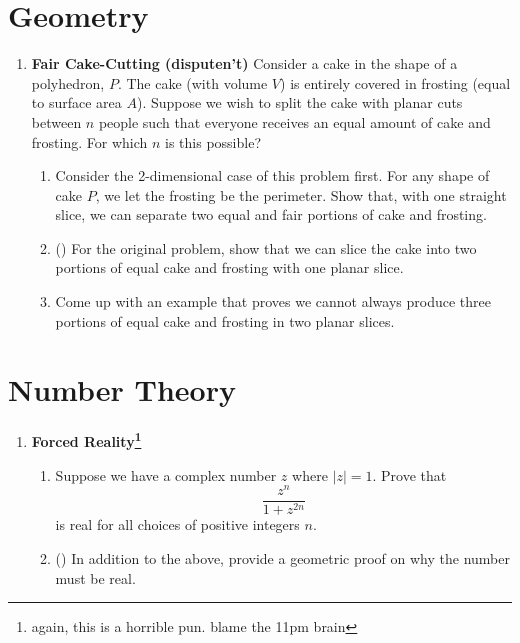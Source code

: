 \documentclass[11pt]{scrartcl}
\begin{document}
\section{Geometry}
\begin{enumerate}[label=\textbf{G\arabic*}.]
    \item \textbf{Fair Cake-Cutting (disputen't)} \newline
    Consider a cake in the shape of a polyhedron, $P$. The cake (with volume $V$) is entirely covered in frosting (equal to surface area $A$). Suppose we wish to split the cake with planar cuts between $n$ people such that everyone receives an equal amount of cake and frosting. For which $n$ is this possible?
    
    \begin{enumerate}
        \item Consider the 2-dimensional case of this problem first. For any shape of cake $P$, we let the frosting be the perimeter. Show that, with one straight slice, we can separate two equal and fair portions of cake and frosting.
        
        \item (\fullchili) For the original problem, show that we can slice the cake into two portions of equal cake and frosting with one planar slice.
        
        \item Come up with an example that proves we cannot always produce three portions of equal cake and frosting in two planar slices.
    \end{enumerate}
\end{enumerate}

\newpage
\section{Number Theory}
\begin{enumerate}[label=\textbf{N\arabic*}.]
    \item \textbf{Forced Reality\footnote{again, this is a horrible pun. blame the 11pm brain}}
    \begin{enumerate}
        \item Suppose we have a complex number $z$ where $|z| = 1$. Prove that
        \[ \frac{z^n}{1 + z^{2n}} \]
        is real for all choices of positive integers $n$.
        
        \item (\halfchili) In addition to the above, provide a geometric proof on why the number must be real.
    \end{enumerate}
\end{enumerate}
\end{document}
